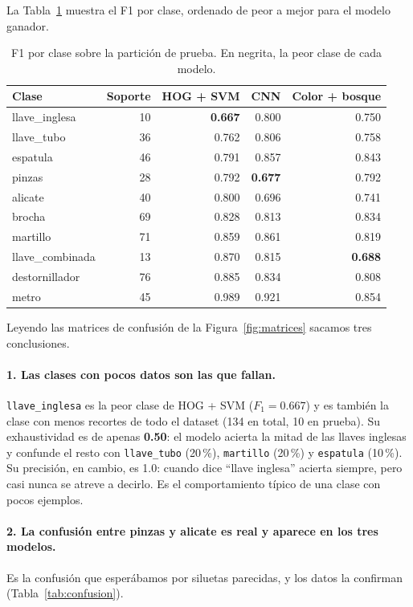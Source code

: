 \documentclass[11pt,a4paper]{article}
\newcommand{\clase}[1]{\texttt{#1}}
\begin{document}
La Tabla~\ref{tab:f1clase} muestra el F1 por clase, ordenado de peor a mejor para el modelo
ganador.

\begin{table}[htbp]
\centering
\caption{F1 por clase sobre la partición de prueba. En negrita, la peor clase de cada modelo.}
\label{tab:f1clase}
\small
\begin{tabular}{@{}lrrrr@{}}
\toprule
\textbf{Clase} & \textbf{Soporte} & \textbf{HOG + SVM} & \textbf{CNN} & \textbf{Color + bosque} \\
\midrule
llave\_inglesa   & 10 & \textbf{0.667} & 0.800 & 0.750 \\
llave\_tubo      & 36 & 0.762 & 0.806 & 0.758 \\
espatula         & 46 & 0.791 & 0.857 & 0.843 \\
pinzas           & 28 & 0.792 & \textbf{0.677} & 0.792 \\
alicate          & 40 & 0.800 & 0.696 & 0.741 \\
brocha           & 69 & 0.828 & 0.813 & 0.834 \\
martillo         & 71 & 0.859 & 0.861 & 0.819 \\
llave\_combinada & 13 & 0.870 & 0.815 & \textbf{0.688} \\
destornillador   & 76 & 0.885 & 0.834 & 0.808 \\
metro            & 45 & 0.989 & 0.921 & 0.854 \\
\bottomrule
\end{tabular}
\end{table}

Leyendo las matrices de confusión de la Figura~\ref{fig:matrices} sacamos tres conclusiones.

\paragraph{1. Las clases con pocos datos son las que fallan.}
\clase{llave\_inglesa} es la peor clase de HOG + SVM ($F_1 = 0.667$) y es también la clase con menos
recortes de todo el dataset (134 en total, 10 en prueba). Su exhaustividad es de apenas
\textbf{0.50}: el modelo acierta la mitad de las llaves inglesas y confunde el resto con
\clase{llave\_tubo} (20\,\%), \clase{martillo} (20\,\%) y \clase{espatula} (10\,\%). Su precisión,
en cambio, es 1.0: cuando dice \enquote{llave inglesa} acierta siempre, pero casi nunca se atreve a
decirlo. Es el comportamiento típico de una clase con pocos ejemplos.

\paragraph{2. La confusión entre pinzas y alicate es real y aparece en los tres modelos.}
Es la confusión que esperábamos por siluetas parecidas, y los datos la confirman
(Tabla~\ref{tab:confusion}).
\end{document}
